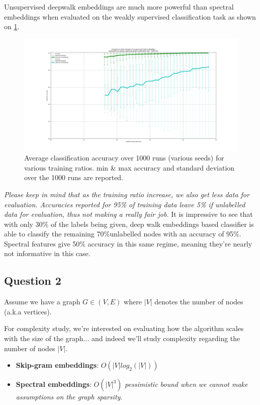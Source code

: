 \documentclass[a4paper]{article}
\begin{document}
Unsupervised deepwalk embeddings are much more powerful than spectral embeddings when evaluated on
the weakly supervised classification task as shown on \ref{fig:deepwalk_vs_laplacian_embdeddings}.
\begin{figure}[ht]
    \centering
    \includegraphics[width=1.\textwidth]{figures/deepwalk_vs_laplacian_embeddings_1000runs.png}
    \caption{Average classification accuracy over 1000 runs (various seeds) for various training ratios. 
    min \& max accuracy and standard deviation over the 1000 runs are reported.}
    \label{fig:deepwalk_vs_laplacian_embdeddings}
\end{figure}
\textit{Please keep in mind that as the training ratio increase, we also get less data for evaluation.
Accuracies reported for 95\% of training data leave 5\% if unlabelled data for evaluation,
thus not making a really fair job.} It is impressive to see that with only 30\% of the labels being given, deep walk
embeddings based classifier is able to classify the remaining 70\%unlabelled nodes with an accuracy of 95\%.
Spectral features give 50\% accuracy in this same regime, meaning they're nearly not informative in this case.



\subsection*{Question 2}
Assume we have a graph $G \in (V, E)$ where $|V|$ denotes the number of nodes (a.k.a vertices). 

For complexity study, we're interested on evaluating how the algorithm scales with the size of the graph... and indeed we'll study complexity regarding the number of nodes $|V|$.
\begin{itemize}
    \item \textbf{Skip-gram embeddings}: $O(|V|log_{2}(|V|))$
    \item \textbf{Spectral embeddings}: $O(|V|^{3})$ \textit{pessimistic bound when we cannot make assumptions on the graph sparsity}.
\end{itemize}
\end{document}
